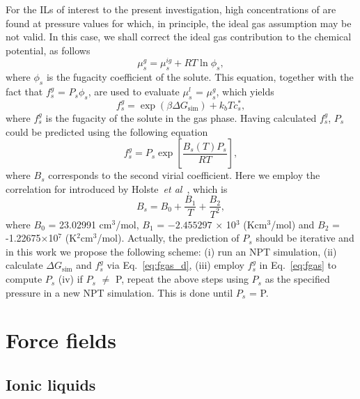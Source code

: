 \documentclass[3p,twocolumn]{elsarticle}
\begin{document}
For the ILs of interest to the present investigation, high concentrations of  are found at pressure values for which, in principle, the ideal gas assumption may be not valid. In this case, we shall correct the ideal gas contribution to the chemical potential, as follows
\begin{equation}
\label{eq:mu_gas_real}
\mu^{g}_s = \mu^{ig}_s + RT \ln \phi_s,
\end{equation}
where $\phi_s$ is the fugacity coefficient of the solute. This equation, together with the fact that $f^{g}_s$ = $P_s \phi_s$, are used to evaluate $\mu^{l}_s$ = $\mu^{g}_s$, which yields
\begin{equation}
\label{eq:fgas_d}
f^{g}_s = \exp  \left( \beta \Delta G_{\text{sim}} \right) +  k_b T c_s^{\ast}, 
\end{equation}
where $f^{g}_s$ is the fugacity of the solute in the gas phase. Having calculated $f^{g}_s$, $P_s$ could be predicted using the following equation
\begin{equation}
\label{eq:fgas}
f^{g}_s = P_s \exp\left[ \frac{B_s(T) P_s}{R T} \right],
\end{equation}
where $B_s$ corresponds to the second virial coefficient. Here we employ the correlation for  introduced by Holste~\textit{et al}~\cite{Holste_1987}, which is
\begin{equation}
B_s = B_0 + \frac{B_1}{T} + \frac{B_2}{T^2},
\end{equation}
where $B_0$ = 23.02991 cm$^3$/mol, $B_1$ = $-2.455297$ $\times$ 10$^3$ (Kcm$^3$/mol) and $B_2$ = -1.22675$\times$10$^7$ (K$^2$cm$^3$/mol). Actually, the prediction of $P_s$ should be iterative and in this work we propose the following scheme: (i) run an NPT simulation, (ii) calculate $\Delta G_{\text{sim}}$ and $f^{g}_s$ via Eq.~\ref{eq:fgas_d}, (iii) employ $f^{g}_s$ in Eq.~\ref{eq:fgas} to compute $P_s$ (iv) if $P_s$ $\neq$ P, repeat the above steps using $P_s$ as the specified pressure in a new NPT simulation. This is done until $P_s$ = P.

\section{Force fields}
\label{sec:force_field}
\subsection{Ionic liquids}
\label{sec:force_field_il}
\end{document}
